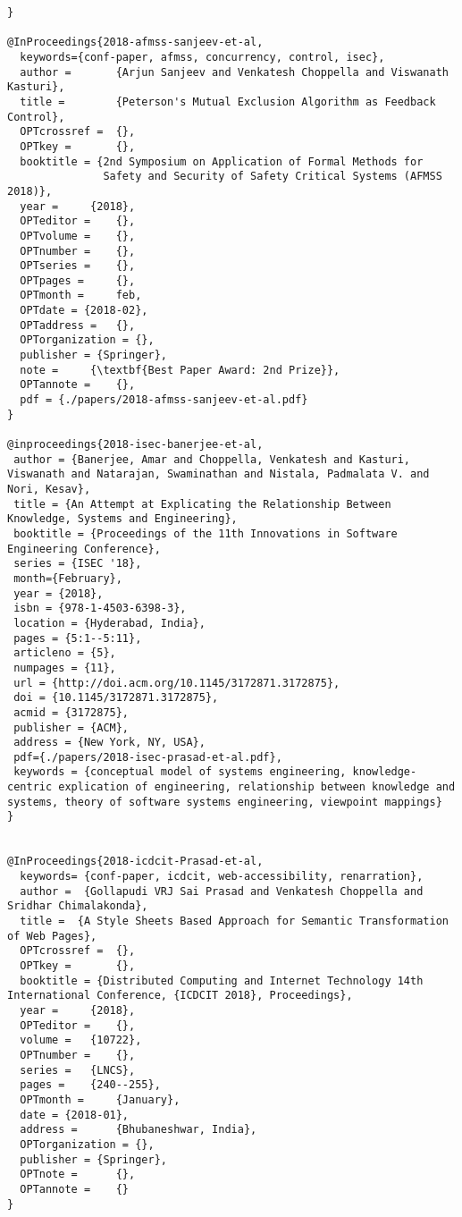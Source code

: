 \documentclass[11pt]{article}
\begin{document}
\begin{lstlisting}
}

@InProceedings{2018-afmss-sanjeev-et-al,
  keywords={conf-paper, afmss, concurrency, control, isec},
  author = 		 {Arjun Sanjeev and Venkatesh Choppella and Viswanath Kasturi},
  title = 		 {Peterson's Mutual Exclusion Algorithm as Feedback Control},
  OPTcrossref =  {},
  OPTkey = 		 {},
  booktitle = {2nd Symposium on Application of Formal Methods for
               Safety and Security of Safety Critical Systems (AFMSS 2018)},
  year = 	 {2018},
  OPTeditor = 	 {},
  OPTvolume = 	 {},
  OPTnumber = 	 {},
  OPTseries = 	 {},
  OPTpages = 	 {},
  OPTmonth = 	 feb,
  OPTdate = {2018-02},
  OPTaddress = 	 {},
  OPTorganization = {},
  publisher = {Springer},
  note = 	 {\textbf{Best Paper Award: 2nd Prize}},
  OPTannote = 	 {},
  pdf = {./papers/2018-afmss-sanjeev-et-al.pdf}
}

@inproceedings{2018-isec-banerjee-et-al,
 author = {Banerjee, Amar and Choppella, Venkatesh and Kasturi, Viswanath and Natarajan, Swaminathan and Nistala, Padmalata V. and Nori, Kesav},
 title = {An Attempt at Explicating the Relationship Between Knowledge, Systems and Engineering},
 booktitle = {Proceedings of the 11th Innovations in Software Engineering Conference},
 series = {ISEC '18},
 month={February}, 
 year = {2018},
 isbn = {978-1-4503-6398-3},
 location = {Hyderabad, India},
 pages = {5:1--5:11},
 articleno = {5},
 numpages = {11},
 url = {http://doi.acm.org/10.1145/3172871.3172875},
 doi = {10.1145/3172871.3172875},
 acmid = {3172875},
 publisher = {ACM},
 address = {New York, NY, USA},
 pdf={./papers/2018-isec-prasad-et-al.pdf},
 keywords = {conceptual model of systems engineering, knowledge-centric explication of engineering, relationship between knowledge and systems, theory of software systems engineering, viewpoint mappings}
}


@InProceedings{2018-icdcit-Prasad-et-al,
  keywords= {conf-paper, icdcit, web-accessibility, renarration},
  author =  {Gollapudi VRJ Sai Prasad and Venkatesh Choppella and Sridhar Chimalakonda},
  title =  {A Style Sheets Based Approach for Semantic Transformation of Web Pages},
  OPTcrossref =  {},
  OPTkey = 		 {},
  booktitle = {Distributed Computing and Internet Technology 14th International Conference, {ICDCIT 2018}, Proceedings},
  year = 	 {2018},
  OPTeditor = 	 {},
  volume = 	 {10722},
  OPTnumber = 	 {},
  series = 	 {LNCS},
  pages = 	 {240--255},
  OPTmonth = 	 {January},
  date = {2018-01},
  address = 	 {Bhubaneshwar, India},
  OPTorganization = {},
  publisher = {Springer},
  OPTnote = 	 {},
  OPTannote = 	 {}
}
\end{lstlisting}
\end{document}

